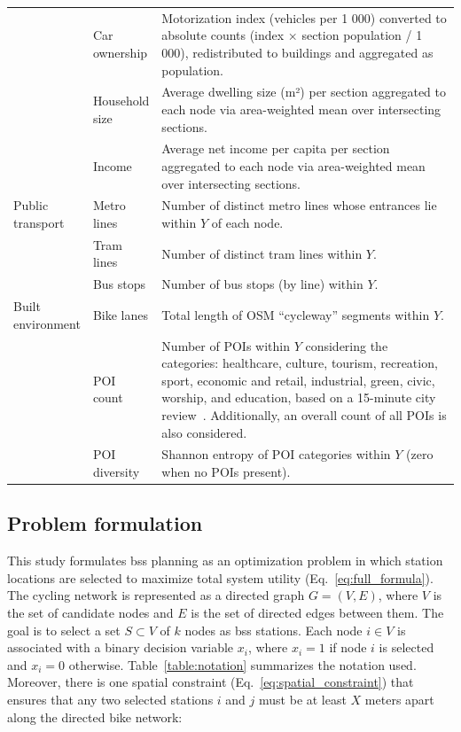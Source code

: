 \begin{table}[!htbp]
\begin{tabular}{p{0.15\linewidth} p{0.12\linewidth} p{0.73\linewidth}}
              & Car ownership 
                & Motorization index (vehicles per 1 000) converted to absolute counts (index × section population / 1 000), redistributed to buildings and aggregated as population. \\
              & Household size 
                & Average dwelling size (m²) per section aggregated to each node via area-weighted mean over intersecting sections. \\
              & Income 
                & Average net income per capita per section aggregated to each node via area-weighted mean over intersecting sections. \\
            \midrule
            
            Public transport  & Metro lines 
                & Number of distinct metro lines whose entrances lie within \(Y\) of each node. \\
              & Tram lines 
                & Number of distinct tram lines within \(Y\). \\
              & Bus stops 
                & Number of bus stops (by line) within \(Y\). \\
            \midrule
            
            Built environment & Bike lanes 
                & Total length of OSM “cycleway” segments within \(Y\). \\
              & POI count 
                & Number of POIs within \(Y\) considering the categories: healthcare, culture, tourism, recreation, sport, economic and retail, industrial, green, civic, worship, and education, based on a 15-minute city review~\cite{Papadopoulos2023}. Additionally, an overall count of all POIs is also considered.\\
              & POI diversity 
                & Shannon entropy of POI categories within \(Y\) (zero when no POIs present). \\
            \bottomrule
        \end{tabular}
    \end{table}

\subsection{Problem formulation}

    This study formulates \ac{bss} planning as an optimization problem in which station locations are selected to maximize total system utility (Eq.~\ref{eq:full_formula}). The cycling network is represented as a directed graph $G=(V,E)$, where $V$ is the set of candidate nodes and $E$ is the set of directed edges between them. The goal is to select a set $S \subset V$ of $k$ nodes as \ac{bss} stations. Each node $i \in V$ is associated with a binary decision variable $x_i$, where $x_i = 1$ if node $i$ is selected and $x_i = 0$ otherwise. Table~\ref{table:notation} summarizes the notation used. Moreover, there is one spatial constraint (Eq.~\ref{eq:spatial_constraint}) that ensures that any two selected stations $i$ and $j$ must be at least $X$ meters apart along the directed bike network:


